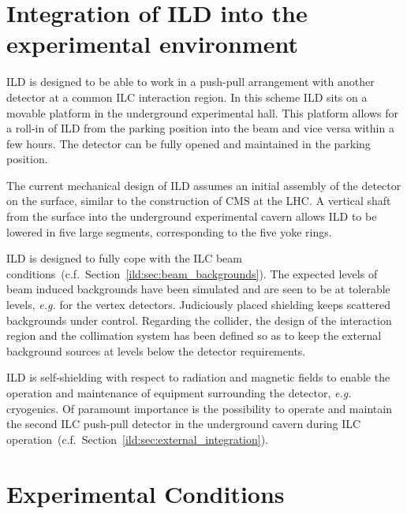 \section{Integration of ILD into the experimental environment}
ILD is designed to be able to work in a push-pull arrangement with another detector at a common ILC interaction region. In this scheme ILD sits on a movable platform in the underground experimental hall. This platform allows for a roll-in of ILD from the parking position into the beam and vice versa within a few hours. The detector can be fully opened and maintained in the parking position.

The current mechanical design of ILD assumes an initial assembly of the detector on the surface, similar to the construction of CMS at the LHC. A vertical shaft from the surface into the underground experimental cavern allows ILD to be lowered in five large segments, corresponding to the five yoke rings.

ILD is designed to fully cope with the ILC beam conditions~(c.f.~Section~\ref{ild:sec:beam_backgrounds}). The expected levels of beam induced backgrounds have been simulated and are seen to be at tolerable levels, {\it e.g.} for the vertex detectors. Judiciously placed shielding keeps scattered backgrounds under control. Regarding the collider, the design of the interaction region and the collimation system has been defined so as to keep the external background sources at levels below the detector requirements.

ILD is self-shielding with respect to radiation and magnetic fields to enable the operation and maintenance of equipment surrounding the detector, {\it e.g.} cryogenics. Of paramount importance is the possibility to operate and maintain the second ILC push-pull detector in the underground cavern during ILC operation~(c.f.~Section~\ref{ild:sec:external_integration}).

\section{Experimental Conditions}
 
